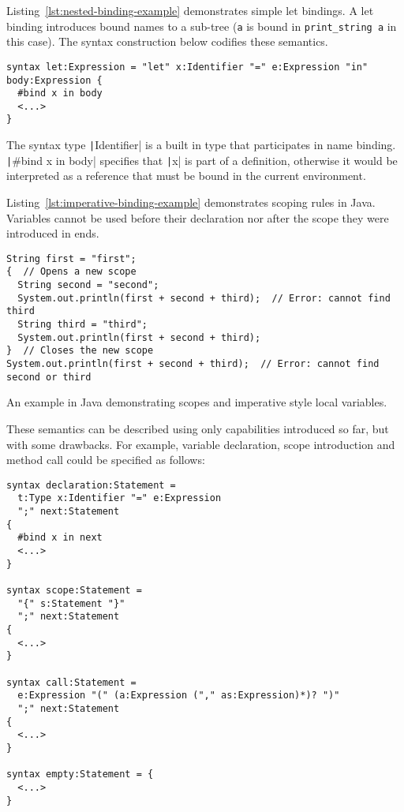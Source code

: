 \documentclass{kththesis}
\begin{document}
Listing~\ref{lst:nested-binding-example} demonstrates simple let bindings. A let binding introduces bound names to a sub-tree (\texttt{a} is bound in \texttt{print_string a} in this case). The syntax construction below codifies these semantics.

\begin{verbatim}
syntax let:Expression = "let" x:Identifier "=" e:Expression "in" body:Expression {
  #bind x in body
  <...>
}
\end{verbatim}

The syntax type \texttt|Identifier| is a built in type that participates in name binding. \texttt|#bind x in body| specifies that \texttt|x| is part of a definition, otherwise it would be interpreted as a reference that must be bound in the current environment.

Listing~\ref{lst:imperative-binding-example} demonstrates scoping rules in Java. Variables cannot be used before their declaration nor after the scope they were introduced in ends.

\begin{listing}
\begin{verbatim}
String first = "first";
{  // Opens a new scope
  String second = "second";
  System.out.println(first + second + third);  // Error: cannot find third
  String third = "third";
  System.out.println(first + second + third);
}  // Closes the new scope
System.out.println(first + second + third);  // Error: cannot find second or third
\end{verbatim}
\caption{An example in Java demonstrating scopes and imperative style local variables.}
\label{lst:imperative-binding-example}
\end{listing}

These semantics can be described using only capabilities introduced so far, but with some drawbacks. For example, variable declaration, scope introduction and method call could be specified as follows:

\begin{verbatim}
syntax declaration:Statement =
  t:Type x:Identifier "=" e:Expression
  ";" next:Statement
{
  #bind x in next
  <...>
}

syntax scope:Statement =
  "{" s:Statement "}"
  ";" next:Statement
{
  <...>
}

syntax call:Statement =
  e:Expression "(" (a:Expression ("," as:Expression)*)? ")"
  ";" next:Statement
{
  <...>
}

syntax empty:Statement = {
  <...>
}
\end{verbatim}
\end{document}
